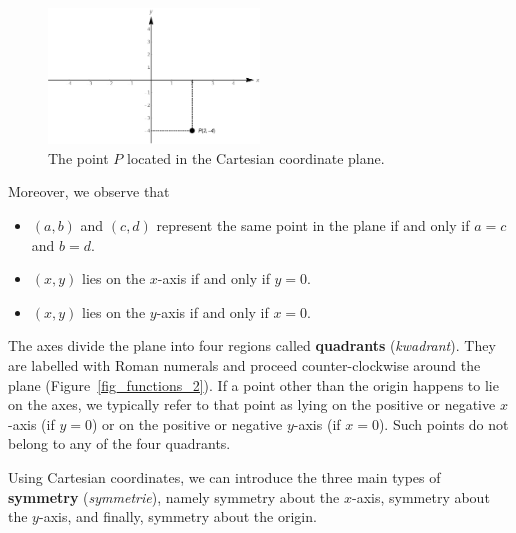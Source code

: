 \begin{figure}
	\begin{center}
			\includegraphics[width=0.5\textwidth]{fig_functions_1}
	\caption{The point $P$ located in the Cartesian coordinate plane.}
	\label{fig_functions_1}
	\end{center}
\end{figure}


\ifvc
 Moreover, we observe that
\begin{itemize}

\item $(a,b)$ and $(c,d)$ represent the same point in the plane if and only if $a = c$ and $b = d$.

\item  $(x,y)$ lies on the $x$-axis if and only if $y = 0$.

\item  $(x,y)$ lies on the $y$-axis if and only if $x=0$.

\end{itemize}
\fi



The axes divide the plane into four regions called  \textbf{quadrants} (\textit{kwadrant}).  They are labelled with Roman numerals and proceed counter-clockwise around the plane \ifvc (Figure~\ref{fig_functions_2})\fi. If a point other than the origin happens to lie on the axes, we typically refer to that point as lying on the positive or negative $x$-axis (if $y = 0$) or on the positive or negative $y$-axis (if $x = 0$).   Such points do not belong to any of the four quadrants.




Using Cartesian coordinates, we can introduce the three main types of \textbf{symmetry} (\textit{symmetrie}), namely symmetry about the $x$-axis, symmetry about the $y$-axis, and finally, symmetry about the origin. 


